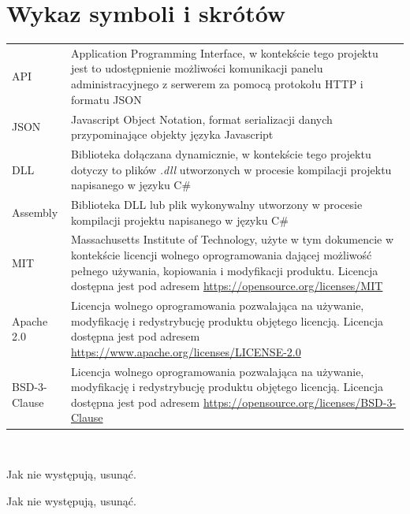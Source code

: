 \documentclass[a4paper,11pt,twoside]{report}
\theoremstyle{definition}
\begin{document}
\thispagestyle{empty}



\chapter*{Wykaz symboli i skrótów}

\begin{tabular}{p{} p{}}
    API 
    & Application Programming Interface, w kontekście tego projektu jest to udostępnienie możliwości komunikacji panelu administracyjnego z serwerem za pomocą protokołu HTTP i formatu JSON \\
    JSON
    & Javascript Object Notation, format serializacji danych przypominające objekty języka Javascript \\
    DLL
    & Biblioteka dołączana dynamicznie, w kontekście tego projektu dotyczy to plików \textit{.dll} utworzonych w procesie kompilacji projektu napisanego w języku C\# \\
    Assembly
    & Biblioteka DLL lub plik wykonywalny utworzony w procesie kompilacji projektu napisanego w języku C\# \\
    MIT
    & Massachusetts Institute of Technology, użyte w tym dokumencie w kontekście licencji wolnego oprogramowania dającej możliwość pełnego używania, kopiowania i modyfikacji produktu. Licencja dostępna jest pod adresem \newline
    \url{https://opensource.org/licenses/MIT} \\
    Apache 2.0
    & Licencja wolnego oprogramowania pozwalająca na używanie, modyfikację i redystrybucję produktu objętego licencją. Licencja dostępna jest pod adresem \newline
    \url{https://www.apache.org/licenses/LICENSE-2.0} \\
    BSD-3-Clause
    & Licencja wolnego oprogramowania pozwalająca na używanie, modyfikację i redystrybucję produktu objętego licencją. Licencja dostępna jest pod adresem \newline
    \url{https://opensource.org/licenses/BSD-3-Clause}
\end{tabular}
\\
\thispagestyle{empty}


\listoffigures
\thispagestyle{empty}
Jak nie występują, usunąć.


\renewcommand{\listtablename}{Spis tabel}
\listoftables
\thispagestyle{empty}
Jak nie występują, usunąć.
\end{document}
